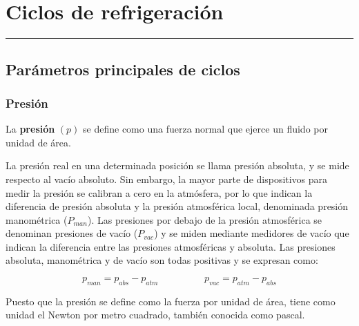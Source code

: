 \chapter{Ciclos de refrigeración}

\vspace{\fill}

\hrule

\vspace{.3cm}

{\large \lipsum[1]} 

\pagestyle{fancy}

\newpage

\section{Parámetros principales de ciclos}

\subsection{Presión}

\begin{defs}
    La \textbf{presión} $(p)$ se define como una fuerza normal que ejerce un fluido por unidad de área.
\end{defs}

La presión real en una determinada posición se llama presión absoluta, y se mide respecto al vacío absoluto. Sin embargo, la mayor parte de dispositivos para medir la presión se calibran a cero en la atmósfera, por lo que indican la diferencia de presión absoluta y la presión atmosférica local, denominada presión manométrica ($P_{man}$). Las presiones por debajo de la presión atmosférica se denominan presiones de vacío ($P_{vac}$) y se miden mediante medidores de vacío que indican la diferencia entre las presiones atmosféricas y absoluta. Las presiones absoluta, manométrica y de vacío son todas positivas y se expresan como:

\begin{equation}\label{EA1-Relación de presiones}
    p_{man} = p_{abs} - p_{atm} \hspace{2cm} p_{vac} = p_{atm} - p_{abs}
\end{equation}


Puesto que la presión se define como la fuerza por unidad de área, tiene como unidad el Newton por metro cuadrado, también conocida como pascal.


